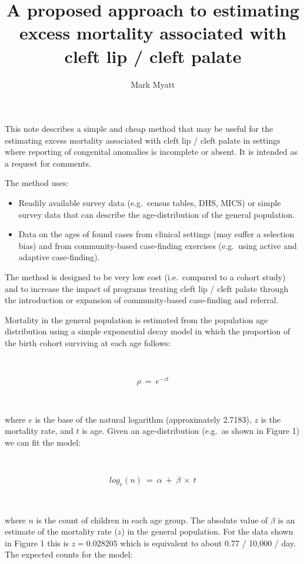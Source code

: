 \documentclass[12pt,a4paper]{article}
\title{A proposed approach to estimating excess mortality associated with cleft
lip / cleft palate}
\author{Mark Myatt}
\date{}
\begin{document}
\maketitle

This note describes a simple and cheap method that may be useful for the
estimating excess mortality associated with cleft lip / cleft palate in
settings where reporting of congenital anomalies is incomplete or
absent. It is intended as a request for comments.

The method uses:

\begin{itemize}
\item
  Readily available survey data (e.g.~census tables, DHS, MICS) or
  simple survey data that can describe the age-distribution of the
  general population.
\item
  Data on the ages of found cases from clinical settings (may suffer a
  selection bias) and from community-based case-finding exercises
  (e.g.~using active and adaptive case-finding).
\end{itemize}

The method is designed to be very low cost (i.e.~compared to a cohort
study) and to increase the impact of programs treating cleft lip / cleft
palate through the introduction or expansion of community-based
case-finding and referral.

Mortality in the general population is estimated from the population age
distribution using a simple exponential decay model in which the
proportion of the birth cohort surviving at each age follows:

~

\begin{equation}
\rho ~ = ~ e ^ {-zt}
\end{equation}

~

where \(e\) is the base of the natural logarithm (approximately 2.7183),
\(z\) is the mortality rate, and \(t\) is age. Given an age-distribution
(e.g.~as shown in Figure 1) we can fit the model:

~

\begin{equation}
log_e(n) ~ = ~ \alpha ~ + ~ \beta ~ \times ~ t
\end{equation}

~

where \(n\) is the count of children in each age group. The absolute
value of \(\beta\) is an estimate of the mortality rate (\(z\)) in the
general population. For the data shown in Figure 1 this is
\(z = 0.028205\) which is equivalent to about 0.77 / 10,000 / day. The
expected counts for the model:
\end{document}

